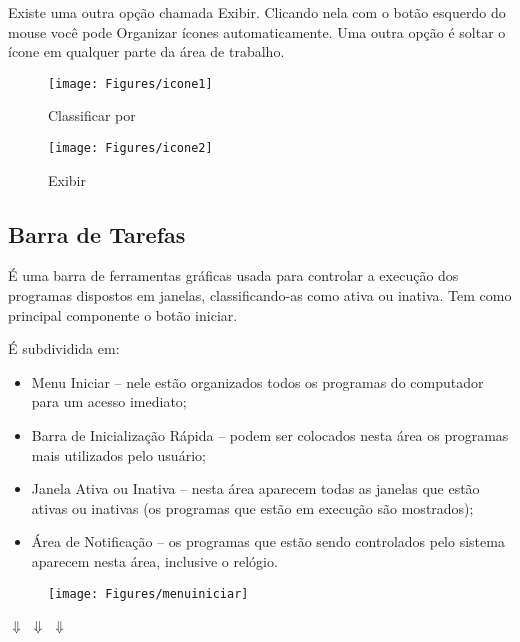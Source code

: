 \documentclass[hidelinks,12pt]{article}
\begin{document}
	 Existe uma outra opção chamada Exibir. Clicando nela com o botão esquerdo do mouse você pode Organizar ícones automaticamente. Uma outra opção é soltar o ícone em qualquer parte da área de trabalho.
	
	
	\begin{figure}[!htbp]
		\centering
		\begin{minipage}[b]{0.45\textwidth}
			\texttt{[image: Figures/icone1]}
			\caption{Classificar por}
			\label{fig:classificar por}
		\end{minipage}
		\hfill
		\begin{minipage}[b]{0.45\textwidth}
			\texttt{[image: Figures/icone2]}
			\caption{Exibir}
			\label{fig:exibir}
		\end{minipage}
	\end{figure}

\subsection{Barra de Tarefas}

	É uma barra de ferramentas gráficas usada para controlar a execução dos programas dispostos em janelas, classificando-as como ativa ou inativa. Tem como principal componente o botão iniciar.
	
	É subdividida em:
	
\begin{itemize}
	\item Menu Iniciar – nele estão organizados todos os programas do computador para um acesso imediato;

	\item Barra de Inicialização Rápida – podem ser colocados nesta área os programas mais utilizados pelo usuário;

	\item Janela Ativa ou Inativa – nesta área aparecem todas as janelas que estão ativas ou inativas (os programas que estão em execução são mostrados);

	\item Área de Notificação – os programas que estão sendo controlados pelo sistema aparecem nesta área, inclusive o relógio.
	
\end{itemize}
	
		\begin{figure}[!hb]
			\texttt{[image: Figures/menuiniciar]}
			\label{fig:menu iniciar}
		
		\end{figure}	
	  {\vspace{-0.8cm}\hspace{-0.6cm}\huge{$\Downarrow$}}     {\vspace{-0.8cm}\hspace{3.6cm}\huge{$\Downarrow$}}
	  {\vspace{-0.8cm}\hspace{7.6cm}\huge{$\Downarrow$}}\\
	  \bigskip
	  
\end{document}
